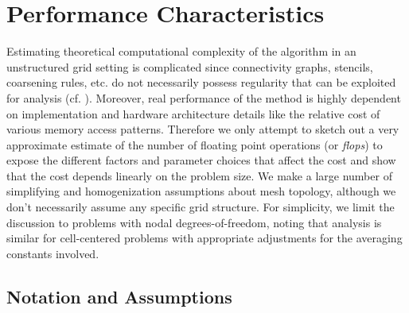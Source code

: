 \section{Performance Characteristics}
\label{sec:par_performance}

Estimating theoretical computational complexity of the algorithm in an unstructured grid setting is complicated since connectivity graphs, stencils, coarsening rules, etc. do not necessarily possess regularity that can be exploited for analysis (cf. \cite{Manea2016}).   Moreover, real performance of the method is highly dependent on implementation and hardware architecture details like the relative cost of various memory access patterns.    Therefore we only attempt to sketch out a very approximate estimate of the number of floating point operations (or \textit{flops}) to expose the different factors and parameter choices that affect the cost and show that the cost depends linearly on the problem size.   We make a large number of simplifying and homogenization assumptions about mesh topology, although we don't necessarily assume any specific grid structure.   For simplicity, we limit the discussion to problems with nodal degrees-of-freedom, noting that analysis is similar for cell-centered problems with appropriate adjustments for the averaging constants involved.

\subsection{Notation and Assumptions}
\label{subsec:par_performance_notation}

